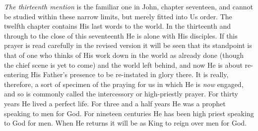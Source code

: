 \textit{The thirteenth mention} is the familiar one in John, chapter seventeen,
and cannot be studied within these narrow limits, but merely fitted into
Us order. The twelfth chapter contains His last words to the world. In the
thirteenth and through to the close of this seventeenth He is alone with
His disciples. If this prayer is read carefully in the revised version it
will be seen that its standpoint is that of one who thinks of His work
down in the world as already done (though the chief scene is yet to come)
and the world left behind, and now He is about re-entering His Father's
presence to be re-instated in glory there. It is really, therefore, a sort
of specimen of the praying for us in which He is \textit{now} engaged, and so is
commonly called the intercessory or high-priestly prayer. For thirty years
He lived a perfect life. For three and a half years He was a prophet
speaking to men for God. For nineteen centuries He has been high priest
speaking to God for men. When He returns it will be as King to reign over
men for God.

